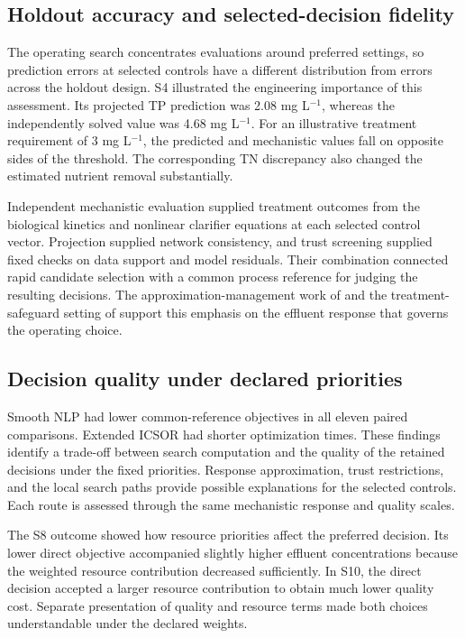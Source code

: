 \subsection{Holdout accuracy and selected-decision fidelity}

The operating search concentrates evaluations around preferred settings, so prediction errors at selected controls have a different distribution from errors across the holdout design. S4 illustrated the engineering importance of this assessment. Its projected TP prediction was 2.08 mg L$^{-1}$, whereas the independently solved value was 4.68 mg L$^{-1}$. For an illustrative treatment requirement of 3 mg L$^{-1}$, the predicted and mechanistic values fall on opposite sides of the threshold. The corresponding TN discrepancy also changed the estimated nutrient removal substantially.

Independent mechanistic evaluation supplied treatment outcomes from the biological kinetics and nonlinear clarifier equations at each selected control vector. Projection supplied network consistency, and trust screening supplied fixed checks on data support and model residuals. Their combination connected rapid candidate selection with a common process reference for judging the resulting decisions. The approximation-management work of \citet{Hameed2026} and the treatment-safeguard setting of \citet{Ren2026} support this emphasis on the effluent response that governs the operating choice.

\subsection{Decision quality under declared priorities}

Smooth NLP had lower common-reference objectives in all eleven paired comparisons. Extended ICSOR had shorter optimization times. These findings identify a trade-off between search computation and the quality of the retained decisions under the fixed priorities. Response approximation, trust restrictions, and the local search paths provide possible explanations for the selected controls. Each route is assessed through the same mechanistic response and quality scales.

The S8 outcome showed how resource priorities affect the preferred decision. Its lower direct objective accompanied slightly higher effluent concentrations because the weighted resource contribution decreased sufficiently. In S10, the direct decision accepted a larger resource contribution to obtain much lower quality cost. Separate presentation of quality and resource terms made both choices understandable under the declared weights.


